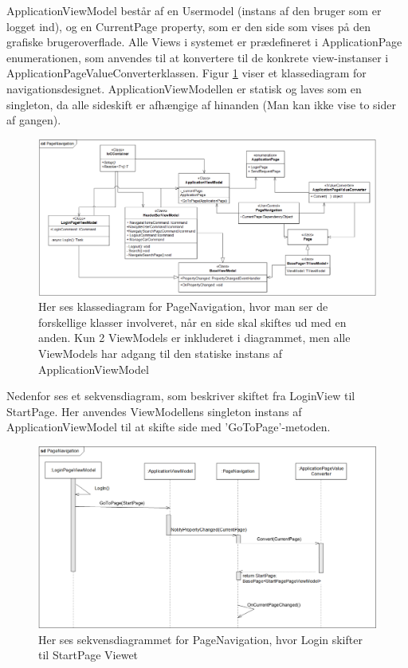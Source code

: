 \documentclass[Rapport/Rapport_main.tex]{subfiles}
\begin{document}
ApplicationViewModel består af en Usermodel (instans af den bruger som er logget ind), og en CurrentPage property, som er den side som vises på den grafiske brugeroverflade. Alle Views i systemet er prædefineret i ApplicationPage enumerationen, som anvendes til at konvertere til de konkrete view-instanser i ApplicationPageValueConverterklassen. Figur \ref{fig:PageNavigation_CD} viser et klassediagram for navigationsdesignet. ApplicationViewModellen er statisk og laves som en singleton, da alle sideskift er afhængige af hinanden (Man kan ikke vise to sider af gangen). 
\begin{figure}[H]
    \centering
    \includegraphics[width=\textwidth]{SoftwareDesign/MVVMDesigns/Graphics/PageNavigationcd.png}
    \caption{Her ses klassediagram for PageNavigation, hvor man ser de forskellige klasser involveret, når en side skal skiftes ud med en anden. Kun 2 ViewModels er inkluderet i diagrammet, men alle ViewModels har adgang til den statiske instans af ApplicationViewModel}
    \label{fig:PageNavigation_CD}
\end{figure}
Nedenfor ses et sekvensdiagram, som beskriver skiftet fra LoginView til StartPage. Her anvendes ViewModellens singleton instans af ApplicationViewModel til at skifte side med 'GoToPage'-metoden. 
\begin{figure}[H]
    \centering
    \includegraphics[width=\textwidth]{SoftwareDesign/MVVMDesigns/Graphics/PageNavigationSd.png}
    \caption{Her ses sekvensdiagrammet for PageNavigation, hvor Login skifter til StartPage Viewet}
    \label{fig:PageNavigation_SD}
\end{figure}
\end{document}
